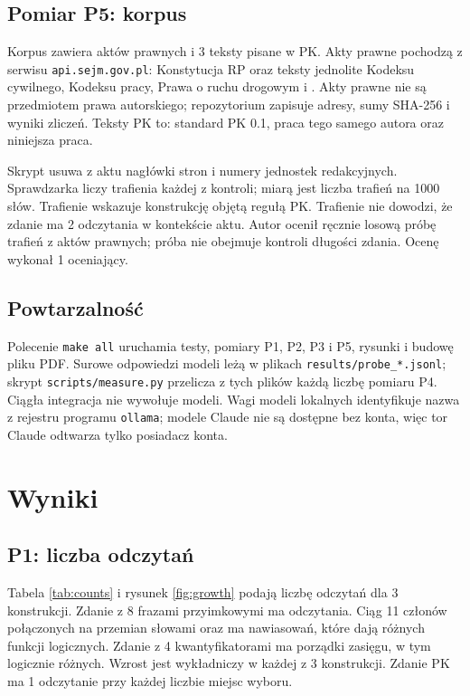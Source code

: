 \subsection{Pomiar P5: korpus}

Korpus zawiera \pkCorpusActs{} aktów prawnych i 3 teksty pisane w PK. Akty prawne pochodzą
z serwisu \texttt{api.sejm.gov.pl}: Konstytucja RP oraz teksty jednolite Kodeksu cywilnego,
Kodeksu pracy, Prawa o ruchu drogowym i . Akty prawne
nie są przedmiotem prawa autorskiego; repozytorium zapisuje adresy, sumy SHA-256 i wyniki
zliczeń. Teksty PK to: standard PK 0.1, praca  tego samego autora
oraz niniejsza praca.

Skrypt usuwa z aktu nagłówki stron i numery jednostek redakcyjnych. Sprawdzarka liczy
trafienia każdej z \pkLintChecks{} kontroli; miarą jest liczba trafień na 1000 słów.
Trafienie wskazuje konstrukcję objętą regułą PK. Trafienie nie dowodzi, że zdanie ma
2 odczytania w kontekście aktu. Autor ocenił ręcznie losową próbę \pkPrecN{} trafień
z aktów prawnych; próba nie obejmuje kontroli długości zdania. Ocenę wykonał 1 oceniający.

\subsection{Powtarzalność}

Polecenie \texttt{make all} uruchamia testy, pomiary P1, P2, P3 i P5, rysunki i budowę
pliku PDF. Surowe odpowiedzi modeli leżą w plikach \texttt{results/probe\_*.jsonl};
skrypt \texttt{scripts/measure.py} przelicza z tych plików każdą liczbę pomiaru P4. Ciągła
integracja nie wywołuje modeli. Wagi modeli lokalnych identyfikuje nazwa z rejestru
programu \texttt{ollama}; modele Claude nie są dostępne bez konta, więc tor Claude
odtwarza tylko posiadacz konta.

\section{Wyniki}
\label{sec:results}

\subsection{P1: liczba odczytań}

Tabela \ref{tab:counts} i rysunek \ref{fig:growth} podają liczbę odczytań dla 3 konstrukcji.
Zdanie z 8 frazami przyimkowymi ma \pkAttachEight{} odczytania. Ciąg 11 członów połączonych
na przemian słowami  oraz  ma \pkBracketElevenAll{} nawiasowań, które dają
\pkBracketEleven{} różnych funkcji logicznych. Zdanie z 4 kwantyfikatorami ma
\pkScopeFourAll{} porządki zasięgu, w tym \pkScopeFour{} logicznie różnych. Wzrost jest
wykładniczy w każdej z 3 konstrukcji. Zdanie PK ma 1 odczytanie przy każdej liczbie
miejsc wyboru.

